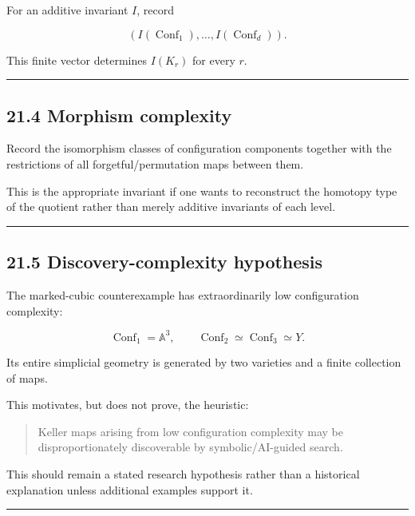 For an additive invariant \(I\), record

\[
(I(\operatorname{Conf}_1),\dots,I(\operatorname{Conf}_d)).
\]

This finite vector determines \(I(K_r)\) for every \(r\).

\begin{center}\rule{0.5\linewidth}{0.5pt}\end{center}

\subsection{21.4 Morphism complexity}\label{morphism-complexity}

Record the isomorphism classes of configuration components together with
the restrictions of all forgetful/permutation maps between them.

This is the appropriate invariant if one wants to reconstruct the
homotopy type of the quotient rather than merely additive invariants of
each level.

\begin{center}\rule{0.5\linewidth}{0.5pt}\end{center}

\subsection{21.5 Discovery-complexity
hypothesis}\label{discovery-complexity-hypothesis}

The marked-cubic counterexample has extraordinarily low configuration
complexity:

\[
\operatorname{Conf}_1=\mathbb A^3,\qquad
\operatorname{Conf}_2\simeq\operatorname{Conf}_3\simeq Y.
\]

Its entire simplicial geometry is generated by two varieties and a
finite collection of maps.

This motivates, but does not prove, the heuristic:

\begin{quote}
Keller maps arising from low configuration complexity may be
disproportionately discoverable by symbolic/AI-guided search.
\end{quote}

This should remain a stated research hypothesis rather than a historical
explanation unless additional examples support it.

\begin{center}\rule{0.5\linewidth}{0.5pt}\end{center}

